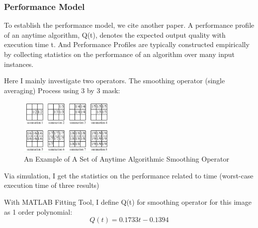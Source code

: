 \documentclass[twocolumn]{article}
\begin{document}
\subsubsection{Performance Model}
To establish the performance model, we cite another paper\cite{Using anyt}\relax. A performance profile of an anytime algorithm, Q(t), denotes the expected output quality with execution time t. And Performance Profiles are typically constructed empirically by collecting statistics on the performance of an algorithm over many input instances. 

Here I mainly investigate two operators. The smoothing operator (single averaging) Process using 3 by 3 mask:

\begin{figure}[H]
\centering
  \includegraphics[width=0.4\textwidth]{sum.jpg}
\caption{An Example of A Set of Anytime Algorithmic Smoothing Operator}
\end{figure}

Via simulation, I get the statistics on the performance related to time (worst-case execution time of three results)
\begin{table}[h!]
\centering
{}
\caption{Performance with Different Smoothing Operator}
\end{table}

With MATLAB Fitting Tool, I define Q(t) for smoothing operator for this image as 1 order polynomial:
\begin{equation*}
Q(t) =  0.1733t-0.1394
\end{equation*}
\end{document}
